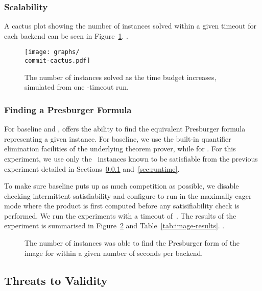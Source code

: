 \documentclass[acmsmall,review,anonymous,screen]{acmart}\settopmatter{printfolios=true,printccs=false,printacmref=true}
\theoremstyle{definition}
\begin{document}
\subsubsection{Scalability}\label{sec:scaling}

A cactus plot showing the number of instances solved within a given timeout for each backend can be seen in Figure~\ref{fig:cactus}. .

\begin{figure}
  \texttt{[image: graphs/\\commit-cactus.pdf]}
  \caption{The number of instances solved as the time budget increases, simulated from one \RuntimeTimeout-timeout run.}
  \label{fig:cactus}
\end{figure}

\subsubsection{Finding a Presburger Formula}\label{sec:evaluation:finding-image}

For baseline and \Calculus{}, \Catra{} offers the ability to find the equivalent Presburger formula representing a given instance. For baseline, we use the built-in quantifier elimination facilities of the underlying \Princess{} theorem prover, while for \Catra{} . For this experiment, we use only the~\NrKnownSat{} instances known to be satisfiable from the previous experiment detailed in Sections~\ref{sec:scaling} and~\ref{sec:runtime}. 

To make sure baseline puts up as much competition as possible, we disable
checking intermittent satisfiability and configure \Catra{} to run in the
maximally eager mode where the product is first computed before any
satisifiability check is performed. We run the experiments with a timeout of~\ImageTimeout{}. The results of the experiment is summarised
in Figure~\ref{fig:cactus:image} and Table~\ref{tab:image-results}. .

\begin{figure}
  \caption{The number of instances \Catra{} was able to find the Presburger form of the image for within a given number of seconds per backend.}
  \label{fig:cactus:image}
\end{figure}


\subsection{Threats to Validity}
\end{document}

